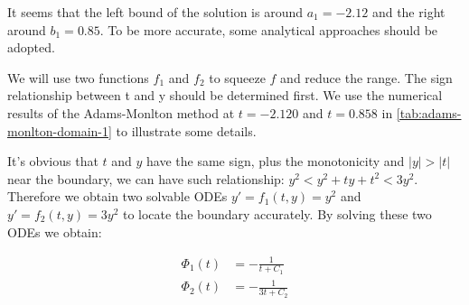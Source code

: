 \documentclass[a4paper]{article}
\begin{document}
	It seems that the left bound of the solution is around $a_1 = -2.12$ and the right around $b_1 = 0.85$. To be more accurate, some analytical approaches should be adopted. 
	
	We will use two functions $f_1$ and $f_2$ to squeeze $f$ and reduce the range. The sign relationship between t and y should be determined first. We use the numerical results of the Adams-Monlton method at $t = -2.120$ and $t = 0.858$ in \autoref{tab:adams-monlton-domain-1} to illustrate some details.
	
    \begin{table}[H]
    \centering
    \caption{y of the results of the Adams-Monlton method when t = -2.120 and t = 0.858}
    \label{tab:adams-monlton-domain-1}
    \end{table}
    
    It's obvious that $t$ and $y$ have the same sign, plus the monotonicity and $|y| > |t|$ near the boundary, we can have such relationship: $y^2 < y^2 + ty + t^2 < 3y^2$. Therefore we obtain two solvable ODEs $y' = f_1(t, y) = y^2$ and $y' = f_2(t, y) = 3y^2$ to locate the boundary accurately. By solving these two ODEs we obtain:
    
    \begin{align}
        \Phi_1(t) &= -\frac{1}{t + C_1} \\
        \Phi_2(t) &= -\frac{1}{3t + C_2}
    \end{align}
    
\end{document}
